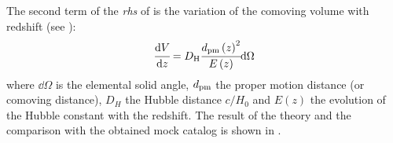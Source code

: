The second term of the \emph{rhs} of  is the variation
of the comoving volume with redshift (see \citet{Hogg+99}):
%
\begin{equation}
    \cfrac{{\rm{d}} V}{{\rm{d}} z} = D_{\rm H} \cfrac{{d_{\rm pm} \left(z\right)}^2}
    {E\left(z\right)} {\rm{d}} \Omega
\end{equation}
%
where $\dd\Omega$ is the elemental solid angle, $d_{\rm pm}$ the proper motion
distance (or comoving distance), $D_H$ the Hubble distance $c/H_0$ and
$E\left(z\right)$ the evolution of the Hubble constant with the redshift. The
result of the theory and the comparison with the obtained mock catalog is shown
in .

